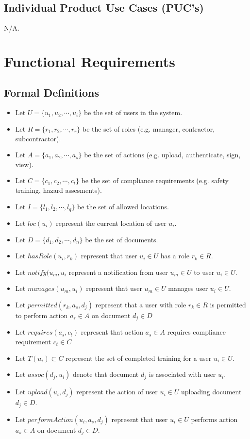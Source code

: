 \documentclass[12pt]{article}
\begin{document}
\subsection{Individual Product Use Cases (PUC's)}
N/A.
\section{Functional Requirements}
\subsection{Formal Definitions}
\begin{itemize}
  \item Let \(U = \{u_1, u_2, \cdots, u_i\}\) be the set of users in the system.
  \item Let \(R = \{r_1, r_2, \cdots, r_r\}\) be the set of roles (e.g. manager,
  contractor, subcontractor).
  \item Let \(A = \{a_1, a_2, \cdots, a_s\}\) be the set of actions (e.g.
    upload, authenticate, sign, view).
  \item Let \(C = \{c_1, c_2, \cdots, c_t\}\) be the set of compliance
    requirements (e.g. safety training, hazard assesments).
  \item Let \(I = \{l_1, l_2, \cdots, l_q\}\) be the set of allowed locations.
  \item Let \(loc(u_i)\) represent the current location of user \(u_i\).
  \item Let \(D = \{d_1, d_2, \cdots, d_n\}\) be the set of documents.
  \item Let \(hasRole(u_i, r_k)\) represent that user \(u_i \in U\) has a role
    \(r_k \in R\).
  \item Let \(notify(u_m, u_i\) represent a notification from user \(u_m \in U\)
    to user \(u_i \in U\).
  \item Let \(manages(u_m, u_i)\) represent that user \(u_m \in U\)
    manages user \(u_i \in U\).
  \item Let \(permitted(r_k, a_s, d_j)\) represent that a user with role \(r_k \in R\)
    is permitted to perform action \(a_s \in A\) on document \(d_j \in D\)
  \item Let \(requires(a_s, c_t)\) represent that action \(a_s \in A\) requires
    compliance requirement \(c_t \in C\)
  \item Let \(T(u_i) \subset C\) represent the set of completed training for a
    user \(u_i \in U\).
  \item Let \(assoc(d_j, u_i)\) denote that document \(d_j\) is associated with
    user \(u_i\).
  \item Let \(upload(u_i, d_j)\) represent the action of user \(u_i \in U\)
    uploading document \(d_j \in D\).
  \item Let \(performAction(u_i, a_s, d_j)\) represent that user \(u_i \in U\)
    performs action \(a_s \in A\) on document \(d_j \in D\).
\end{itemize}
\end{document}
